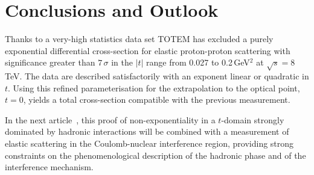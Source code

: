 
\section{Conclusions and Outlook}
%
Thanks to a very-high statistics data set TOTEM has excluded a purely exponential differential 
cross-section for elastic proton-proton scattering with significance greater than $7\,\sigma$
in the $|t|$ range from 0.027 to 0.2\,GeV$^{2}$ at $\sqrt{s}=8\,$TeV. The data
are described satisfactorily with an exponent linear or quadratic in $t$.
Using this refined parameterisation for the extrapolation to the optical point,
$t = 0$, yields a total cross-section compatible with the previous measurement.

In the next article~\cite{1km}, this proof of non-exponentiality in a 
$t$-domain strongly
dominated by hadronic interactions will be combined with a measurement of 
elastic scattering in the Coulomb-nuclear interference region, providing strong
constraints on the phenomenological description of the hadronic phase and of 
the interference mechanism.

